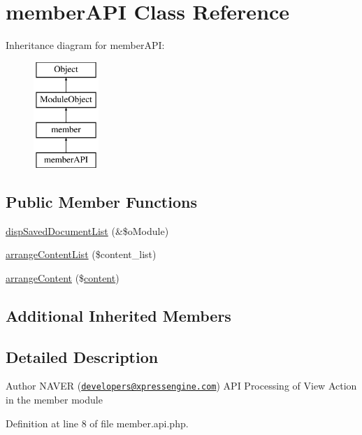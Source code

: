 \hypertarget{classmemberAPI}{\section{member\-A\-P\-I Class Reference}
\label{classmemberAPI}
}
Inheritance diagram for member\-A\-P\-I\-:\begin{figure}[H]
\begin{center}
\leavevmode
\includegraphics[height=4.000000cm]{classmemberAPI}
\end{center}
\end{figure}
\subsection*{Public Member Functions}
\begin{DoxyCompactItemize}
\item 
\hyperlink{classmemberAPI_ab5fd91bb448c7ba48304a12965b81a54}{disp\-Saved\-Document\-List} (\&\$o\-Module)
\item 
\hyperlink{classmemberAPI_accb093980616ddbea40361249379a01b}{arrange\-Content\-List} (\$content\-\_\-list)
\item 
\hyperlink{classmemberAPI_a2f05be1a71de779b38ea5c0e113969ea}{arrange\-Content} (\$\hyperlink{classcontent}{content})
\end{DoxyCompactItemize}
\subsection*{Additional Inherited Members}


\subsection{Detailed Description}
\begin{DoxyAuthor}{Author}
N\-A\-V\-E\-R (\href{mailto:developers@xpressengine.com}{\tt developers@xpressengine.\-com}) A\-P\-I Processing of View Action in the member module 
\end{DoxyAuthor}


Definition at line 8 of file member.\-api.\-php.



